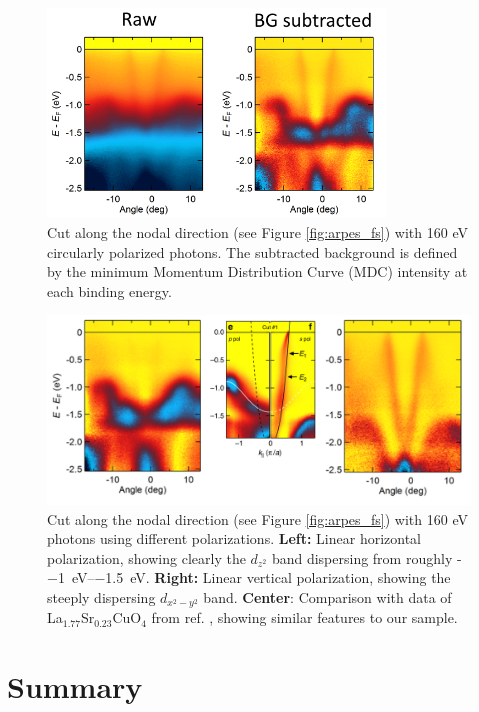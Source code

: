 \begin{figure}
    \centering
    \includegraphics[width=0.8\textwidth]{fig/arpes/hs_cut1.png}
    \caption{Cut along the nodal direction (see Figure \ref{fig:arpes_fs}) with 160 eV circularly polarized photons. The subtracted background is defined by the minimum Momentum Distribution Curve (MDC) intensity at each binding energy.}
    \label{fig:arpes_cut1}
\end{figure}

\begin{figure}
    \centering
    \includegraphics[width=\textwidth]{fig/arpes/arpes_comparison.png}
    \caption{Cut along the nodal direction (see Figure \ref{fig:arpes_fs}) with 160 eV photons using different polarizations. \textbf{Left:} Linear horizontal polarization, showing clearly the $d_{z^2}$ band dispersing from roughly -\SIrange{-1}{-1.5}{\eV}. \textbf{Right:} Linear vertical polarization, showing the steeply dispersing $d_{x^2-y^2}$ band. \textbf{Center}: Comparison with data of La$_{1.77}$Sr$_{0.23}$CuO$_4$ from ref. \cite{Horio2018}, showing similar features to our sample.}
    \label{fig:arpes_cut2}
\end{figure}

\section{Summary}

